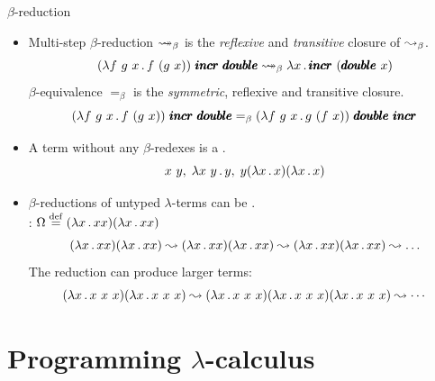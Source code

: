 \documentclass[paper=screen,mode=present,style=zysimple]{powerdot}
\begin{document}
\begin{slide}{$\beta$-reduction}
\begin{itemize}
\item Multi-step $\beta$-reduction $\reduceto_\beta$ is the {\em reflexive} and {\em transitive} closure 
  of $\leadsto_\beta$. 
\vspace*{-0.5em}
$$
(\lambda f \ g \ x \ldot f \ (g \ x)) \ \pmb{incr} \ \pmb{double} 
\reduceto_\beta \lambda x \ldot \pmb{incr} \ (\pmb{double} \ x)
$$ 
$\beta$-equivalence $=_\beta$ is the {\em symmetric}, reflexive and transitive closure. %
\vspace*{-0.5em}
$$
(\lambda f \ g \ x \ldot f \ (g \ x)) \ \pmb{incr} \ \pmb{double} 
=_\beta (\lambda f \ g \ x \ldot g \ (f \ x)) \ \pmb{double} \ \pmb{incr} 
\vspace*{-2em}
$$ 
\item A term without any $\beta$-redexes is a .
\vspace*{-0.5em}
$$ x \ y, \; \lambda x \ y \ldot y, \; y (\lambda x \ldot x) (\lambda x \ldot x) 
\vspace*{-2em}
$$
\item $\beta$-reductions of untyped $\lambda$-terms can be .
\\[0.2em]
\Example : $\Omega \stackrel{\mathrm{def}}{=} (\lambda x \, . \, x x) (\lambda x \, . \, x x)$
\vspace*{-0.5em}
\[
(\lambda x \ldot x x) (\lambda x \ldot x x) 
\reduce (\lambda x \ldot x x) (\lambda x \ldot x x)
\reduce (\lambda x \ldot x x) (\lambda x \ldot x x) 
\reduce \ldots
\vspace*{-0.5em}
\]
The reduction can produce larger terms: \vspace*{-0.5em}
$$
(\lambda x \ldot x \ x \ x) (\lambda x \ldot x \ x \ x) 
\reduce (\lambda x \ldot x \ x \ x) (\lambda x \ldot x \ x \ x) (\lambda x \ldot x \ x \ x)
\reduce \cdots
$$ 
\end{itemize}
\end{slide}

\section{Programming $\lambda$-calculus}
\end{document}
